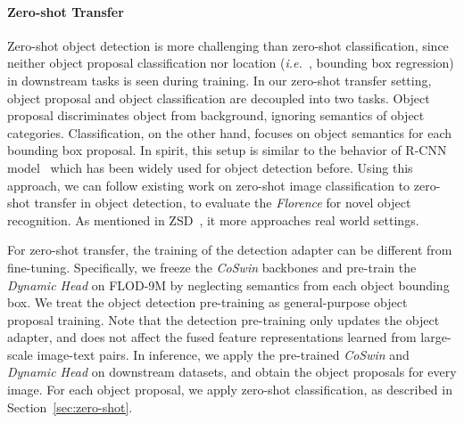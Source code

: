 \documentclass{article}
\newcommand{\ie}{{\it{i.e.}~}}
\begin{document}
\paragraph{Zero-shot Transfer} Zero-shot object detection is more challenging than zero-shot
classification, since neither object proposal classification nor location (\ie, bounding box
regression) in downstream tasks is seen during training. In our zero-shot transfer setting, object proposal and object classification are decoupled into two tasks. Object proposal discriminates object from
background, ignoring semantics of object categories. Classification, on the other hand, focuses on
object semantics for each bounding box proposal.
In spirit, this setup is similar to the behavior of R-CNN model~\cite{RCNN2014} which has been widely used for object detection before. Using this approach, we can follow existing work on zero-shot image classification to zero-shot
transfer in object detection, to evaluate the \emph{Florence} for novel object recognition. As mentioned in ZSD~\cite{bansal2018zero}, it more approaches real world settings.

For zero-shot transfer, the training of the detection adapter can be different from fine-tuning.
Specifically, we freeze the \emph{CoSwin} backbones and pre-train the \emph{Dynamic Head} on FLOD-9M
by neglecting semantics from each object bounding box. We treat the object detection pre-training as
general-purpose object proposal training. Note that the detection pre-training only updates the object adapter, and does not affect the fused
feature representations learned from large-scale image-text pairs. In inference, we apply the pre-trained \emph{CoSwin} and \emph{Dynamic Head} on
downstream datasets, and obtain the object proposals for every image. For each object proposal, we
apply zero-shot classification, as described in Section~\ref{sec:zero-shot}.
\end{document}
